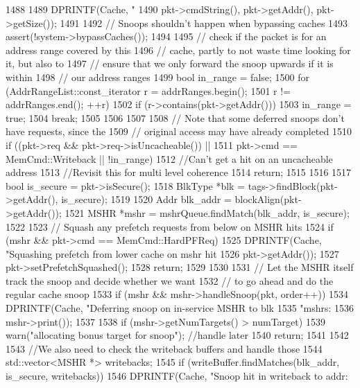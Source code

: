 \begin{DoxyCode}
1488 {
1489     DPRINTF(Cache, "%
1490             pkt->cmdString(), pkt->getAddr(), pkt->getSize());
1491 
1492     // Snoops shouldn't happen when bypassing caches
1493     assert(!system->bypassCaches());
1494 
1495     // check if the packet is for an address range covered by this
1496     // cache, partly to not waste time looking for it, but also to
1497     // ensure that we only forward the snoop upwards if it is within
1498     // our address ranges
1499     bool in_range = false;
1500     for (AddrRangeList::const_iterator r = addrRanges.begin();
1501          r != addrRanges.end(); ++r) {
1502         if (r->contains(pkt->getAddr())) {
1503             in_range = true;
1504             break;
1505         }
1506     }
1507 
1508     // Note that some deferred snoops don't have requests, since the
1509     // original access may have already completed
1510     if ((pkt->req && pkt->req->isUncacheable()) ||
1511         pkt->cmd == MemCmd::Writeback || !in_range) {
1512         //Can't get a hit on an uncacheable address
1513         //Revisit this for multi level coherence
1514         return;
1515     }
1516 
1517     bool is_secure = pkt->isSecure();
1518     BlkType *blk = tags->findBlock(pkt->getAddr(), is_secure);
1519 
1520     Addr blk_addr = blockAlign(pkt->getAddr());
1521     MSHR *mshr = mshrQueue.findMatch(blk_addr, is_secure);
1522 
1523     // Squash any prefetch requests from below on MSHR hits
1524     if (mshr && pkt->cmd == MemCmd::HardPFReq) {
1525         DPRINTF(Cache, "Squashing prefetch from lower cache on mshr hit %
1526                 pkt->getAddr());
1527         pkt->setPrefetchSquashed();
1528         return;
1529     }
1530 
1531     // Let the MSHR itself track the snoop and decide whether we want
1532     // to go ahead and do the regular cache snoop
1533     if (mshr && mshr->handleSnoop(pkt, order++)) {
1534         DPRINTF(Cache, "Deferring snoop on in-service MSHR to blk %
1535                 "mshrs: %
1536                 mshr->print());
1537 
1538         if (mshr->getNumTargets() > numTarget)
1539             warn("allocating bonus target for snoop"); //handle later
1540         return;
1541     }
1542 
1543     //We also need to check the writeback buffers and handle those
1544     std::vector<MSHR *> writebacks;
1545     if (writeBuffer.findMatches(blk_addr, is_secure, writebacks)) {
1546         DPRINTF(Cache, "Snoop hit in writeback to addr: %
}}
\end{DoxyCode}
